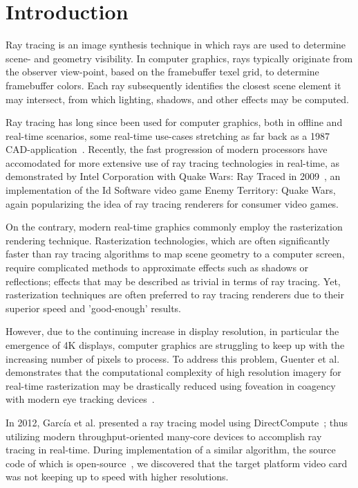 \section{Introduction}
Ray tracing is an image synthesis technique in which rays are used to determine scene- and geometry visibility.
In computer graphics, rays typically originate from the observer view-point, based on the framebuffer texel grid, to determine framebuffer colors.
Each ray subsequently identifies the closest scene element it may intersect, from which lighting, shadows, and other effects may be computed.

Ray tracing has long since been used for computer graphics, both in offline and real-time scenarios, some real-time use-cases stretching as far back as a 1987 CAD-application~\cite{stay87}.
Recently, the fast progression of modern processors have accomodated for more extensive use of ray tracing technologies in real-time, as demonstrated by Intel Corporation with Quake Wars: Ray Traced in 2009~\cite{pohl09}, an implementation of the Id Software video game Enemy Territory: Quake Wars, again popularizing the idea of ray tracing renderers for consumer video games.

On the contrary, modern real-time graphics commonly employ the rasterization rendering technique.
Rasterization technologies, which are often significantly faster than ray tracing algorithms to map scene geometry to a computer screen, require complicated methods to approximate effects such as shadows or reflections; effects that may be described as trivial in terms of ray tracing.
Yet, rasterization techniques are often preferred to ray tracing renderers due to their superior speed and 'good-enough' results.

However, due to the continuing increase in display resolution, in particular the emergence of 4K displays, computer graphics are struggling to keep up with the increasing number of pixels to process.
To address this problem, Guenter et al. demonstrates that the computational complexity of high resolution imagery for real-time rasterization may be drastically reduced using foveation in coagency with modern eye tracking devices~\cite{guenter12}.

In 2012, Garc\'ia et al. presented a ray tracing model using DirectCompute~\cite{garcia12}; thus utilizing modern throughput-oriented many-core devices to accomplish ray tracing in real-time.
During implementation of a similar algorithm, the source code of which is open-source~\cite{raytracer}, we discovered that the target platform video card was not keeping up to speed with higher resolutions.

